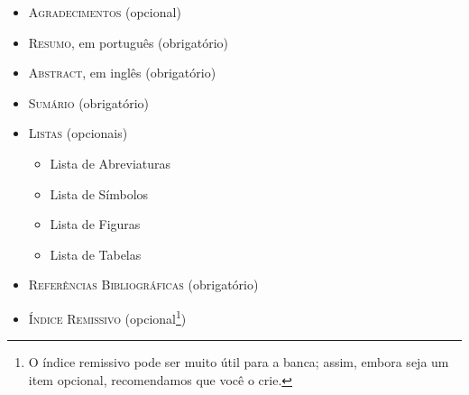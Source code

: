 \begin{itemize}
  \item \textsc{Agradecimentos} (opcional)

  \item \textsc{Resumo}, em português (obrigatório)

  \item \textsc{Abstract}, em inglês (obrigatório)

  \item \textsc{Sumário} (obrigatório)

  \item \textsc{Listas} (opcionais)
  \begin{itemize}
    \item Lista de Abreviaturas
    \item Lista de Símbolos
    \item Lista de Figuras
    \item Lista de Tabelas
  \end{itemize}

  \item \textsc{Referências Bibliográficas} (obrigatório)

  \item \textsc{Índice Remissivo} (opcional\footnote{O índice remissivo
   pode ser muito útil para a banca; assim, embora seja um item opcional,
   recomendamos que você o crie.})
\end{itemize}
